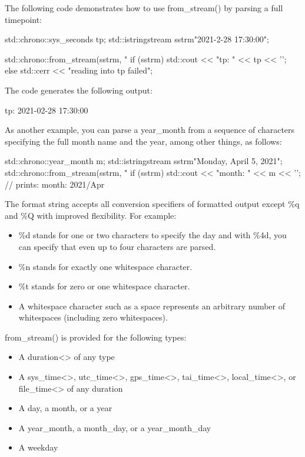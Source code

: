 The following code demonstrates how to use from\_stream() by parsing a full timepoint:

\begin{cpp}
std::chrono::sys_seconds tp;
std::istringstream sstrm{"2021-2-28 17:30:00"};

std::chrono::from_stream(sstrm, "%
if (sstrm) {
	std::cout << "tp: " << tp << '\n';
}
else {
	std::cerr << "reading into tp failed\n";
}
\end{cpp}

The code generates the following output:

\begin{shell}
tp: 2021-02-28 17:30:00
\end{shell}

As another example, you can parse a year\_month from a sequence of characters specifying the full month name and the year, among other things, as follows:

\begin{cpp}
std::chrono::year_month m;
std::istringstream sstrm{"Monday, April 5, 2021"};
std::chrono::from_stream(sstrm, "%
if (sstrm) {
	std::cout << "month: " << m << '\n'; // prints: month: 2021/Apr
}
\end{cpp}

The format string accepts all conversion specifiers of formatted output except \%q and \%Q with improved flexibility. For example:

\begin{itemize}
\item 
\%d stands for one or two characters to specify the day and with \%4d, you can specify that even up to four characters are parsed.

\item 
\%n stands for exactly one whitespace character.

\item 
\%t stands for zero or one whitespace character.

\item 
A whitespace character such as a space represents an arbitrary number of whitespaces (including zero whitespaces).
\end{itemize}

from\_stream() is provided for the following types:

\begin{itemize}
\item 
A duration<> of any type

\item 
A sys\_time<>, utc\_time<>, gps\_time<>, tai\_time<>, local\_time<>, or file\_time<> of any duration

\item 
A day, a month, or a year

\item 
A year\_month, a month\_day, or a year\_month\_day

\item 
A weekday
\end{itemize}

